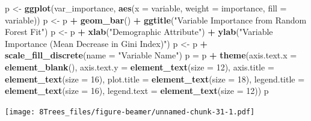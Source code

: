 \documentclass[10pt,ignorenonframetext,]{beamer}
\newenvironment{Shaded}{\begin{snugshade}}{\end{snugshade}}
\newcommand{\KeywordTok}[1]{\textcolor[rgb]{0.13,0.29,0.53}{\textbf{#1}}}
\newcommand{\DataTypeTok}[1]{\textcolor[rgb]{0.13,0.29,0.53}{#1}}
\newcommand{\DecValTok}[1]{\textcolor[rgb]{0.00,0.00,0.81}{#1}}
\newcommand{\StringTok}[1]{\textcolor[rgb]{0.31,0.60,0.02}{#1}}
\newcommand{\OperatorTok}[1]{\textcolor[rgb]{0.81,0.36,0.00}{\textbf{#1}}}
\newcommand{\NormalTok}[1]{#1}
\begin{document}
\begin{frame}[fragile]
\begin{Shaded}
\begin{Highlighting}[]
\NormalTok{p <-}\StringTok{ }\KeywordTok{ggplot}\NormalTok{(var_importance, }\KeywordTok{aes}\NormalTok{(}\DataTypeTok{x =}\NormalTok{ variable, }\DataTypeTok{weight =}\NormalTok{ importance, }
    \DataTypeTok{fill =}\NormalTok{ variable))}
\NormalTok{p <-}\StringTok{ }\NormalTok{p }\OperatorTok{+}\StringTok{ }\KeywordTok{geom_bar}\NormalTok{() }\OperatorTok{+}\StringTok{ }\KeywordTok{ggtitle}\NormalTok{(}\StringTok{"Variable Importance from Random Forest Fit"}\NormalTok{)}
\NormalTok{p <-}\StringTok{ }\NormalTok{p }\OperatorTok{+}\StringTok{ }\KeywordTok{xlab}\NormalTok{(}\StringTok{"Demographic Attribute"}\NormalTok{) }\OperatorTok{+}\StringTok{ }\KeywordTok{ylab}\NormalTok{(}\StringTok{"Variable Importance (Mean Decrease in Gini Index)"}\NormalTok{)}
\NormalTok{p <-}\StringTok{ }\NormalTok{p }\OperatorTok{+}\StringTok{ }\KeywordTok{scale_fill_discrete}\NormalTok{(}\DataTypeTok{name =} \StringTok{"Variable Name"}\NormalTok{)}
\NormalTok{p =}\StringTok{ }\NormalTok{p }\OperatorTok{+}\StringTok{ }\KeywordTok{theme}\NormalTok{(}\DataTypeTok{axis.text.x =} \KeywordTok{element_blank}\NormalTok{(), }\DataTypeTok{axis.text.y =} \KeywordTok{element_text}\NormalTok{(}\DataTypeTok{size =} \DecValTok{12}\NormalTok{), }
    \DataTypeTok{axis.title =} \KeywordTok{element_text}\NormalTok{(}\DataTypeTok{size =} \DecValTok{16}\NormalTok{), }\DataTypeTok{plot.title =} \KeywordTok{element_text}\NormalTok{(}\DataTypeTok{size =} \DecValTok{18}\NormalTok{), }
    \DataTypeTok{legend.title =} \KeywordTok{element_text}\NormalTok{(}\DataTypeTok{size =} \DecValTok{16}\NormalTok{), }\DataTypeTok{legend.text =} \KeywordTok{element_text}\NormalTok{(}\DataTypeTok{size =} \DecValTok{12}\NormalTok{))}
\NormalTok{p}
\end{Highlighting}
\end{Shaded}

\texttt{[image: 8Trees\_files/figure-beamer/unnamed-chunk-31-1.pdf]}

\end{frame}
\end{document}
